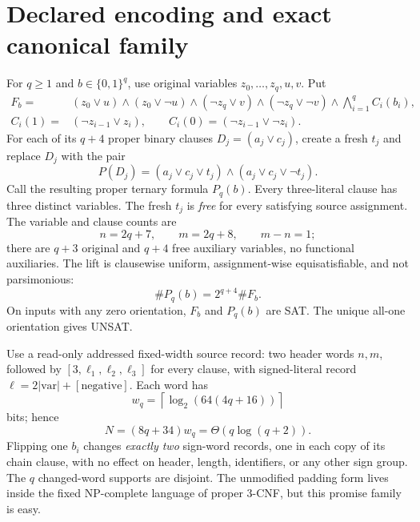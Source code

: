 \documentclass[11pt]{article}
\begin{document}
\section{Declared encoding and exact canonical family}
For \(q\ge1\) and \(b\in\{0,1\}^{q}\), use original variables \(z_0,\ldots,z_q,u,v\). Put
\[
\begin{split}
F_b={}&(z_0\vee u)\wedge(z_0\vee\neg u)
\wedge(\neg z_q\vee v)\wedge(\neg z_q\vee\neg v)
\wedge\bigwedge_{i=1}^{q} C_i(b_i),\\
C_i(1)={}&(\neg z_{i-1}\vee z_i),\qquad
C_i(0)=(\neg z_{i-1}\vee\neg z_i).
\end{split}
\]
For each of its \(q+4\) proper binary clauses \(D_j=(a_j\vee c_j)\), create a fresh \(t_j\) and replace \(D_j\) with the pair
\[
P(D_j)=(a_j\vee c_j\vee t_j)\wedge(a_j\vee c_j\vee\neg t_j).
\]
Call the resulting proper ternary formula \(P_q(b)\). Every three-literal clause has three distinct variables. The fresh \(t_j\) is \emph{free} for every satisfying source assignment. The variable and clause counts are
\[
n=2q+7,\qquad m=2q+8,\qquad m-n=1;
\]
there are \(q+3\) original and \(q+4\) free auxiliary variables, no functional auxiliaries. The lift is clausewise uniform, assignment-wise equisatisfiable, and not parsimonious:
\[
\#P_q(b)=2^{q+4}\#F_b.
\]
On inputs with any zero orientation, \(F_b\) and \(P_q(b)\) are SAT. The unique all-one orientation gives UNSAT.

Use a read-only addressed fixed-width source record: two header words \(n,m\), followed by \([3,\ell_1,\ell_2,\ell_3]\) for every clause, with signed-literal record \(\ell=2|\mathrm{var}|+[\mathrm{negative}]\). Each word has
\[
w_q=\left\lceil\log_2(64(4q+16))\right\rceil
\]
bits; hence
\[
N=(8q+34)w_q=\Theta(q\log(q+2)).
\]
Flipping one \(b_i\) changes \emph{exactly two} sign-word records, one in each copy of its chain clause, with no effect on header, length, identifiers, or any other sign group. The \(q\) changed-word supports are disjoint. The unmodified padding form lives inside the fixed NP-complete language of proper 3-CNF, but this promise family is easy.
\end{document}
